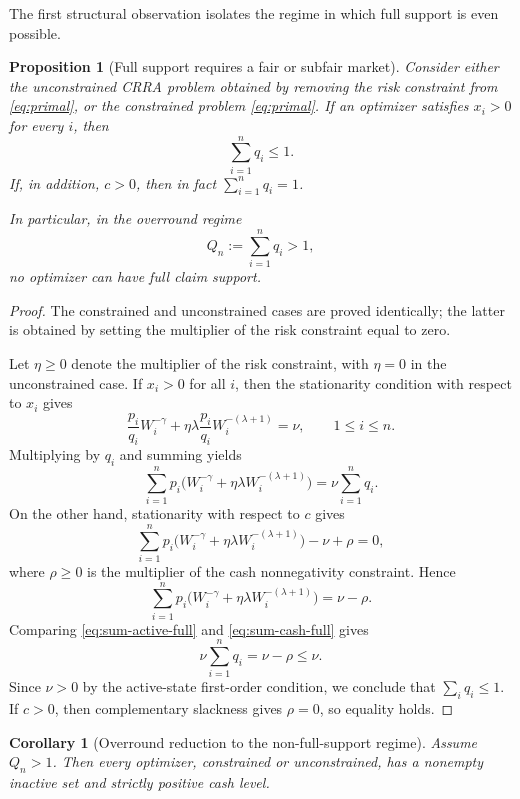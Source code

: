 \documentclass[11pt]{article}
\newtheorem{proposition}[theorem]{Proposition}
\newtheorem{corollary}[theorem]{Corollary}
\theoremstyle{definition}
\theoremstyle{remark}
\newcommand{\1}{\mathbf{1}}
\begin{document}
The first structural observation isolates the regime in which full support is even possible.

\begin{proposition}[Full support requires a fair or subfair market]
\label{prop:full-support-obstruction}
Consider either the unconstrained CRRA problem obtained by removing the risk constraint from \eqref{eq:primal}, or the constrained problem \eqref{eq:primal}. If an optimizer satisfies $x_i>0$ for every $i$, then
\[
\sum_{i=1}^n q_i\le 1.
\]
If, in addition, $c>0$, then in fact $\sum_{i=1}^n q_i=1$.

In particular, in the overround regime
\[
Q_n:=\sum_{i=1}^n q_i>1,
\]
no optimizer can have full claim support.
\end{proposition}

\begin{proof}
The constrained and unconstrained cases are proved identically; the latter is obtained by setting the multiplier of the risk constraint equal to zero.

Let $\eta\ge 0$ denote the multiplier of the risk constraint, with $\eta=0$ in the unconstrained case. If $x_i>0$ for all $i$, then the stationarity condition with respect to $x_i$ gives
\[
\frac{p_i}{q_i}W_i^{-\gamma}+\eta\lambda \frac{p_i}{q_i}W_i^{-(\lambda+1)}=\nu,
\qquad 1\le i\le n.
\]
Multiplying by $q_i$ and summing yields
\begin{equation}
\label{eq:sum-active-full}
\sum_{i=1}^n p_i\bigl(W_i^{-\gamma}+\eta\lambda W_i^{-(\lambda+1)}\bigr)=\nu\sum_{i=1}^n q_i.
\end{equation}
On the other hand, stationarity with respect to $c$ gives
\[
\sum_{i=1}^n p_i\bigl(W_i^{-\gamma}+\eta\lambda W_i^{-(\lambda+1)}\bigr)-\nu+\rho=0,
\]
where $\rho\ge 0$ is the multiplier of the cash nonnegativity constraint. Hence
\begin{equation}
\label{eq:sum-cash-full}
\sum_{i=1}^n p_i\bigl(W_i^{-\gamma}+\eta\lambda W_i^{-(\lambda+1)}\bigr)=\nu-\rho.
\end{equation}
Comparing \eqref{eq:sum-active-full} and \eqref{eq:sum-cash-full} gives
\[
\nu\sum_{i=1}^n q_i=\nu-\rho\le \nu.
\]
Since $\nu>0$ by the active-state first-order condition, we conclude that $\sum_i q_i\le 1$. If $c>0$, then complementary slackness gives $\rho=0$, so equality holds.
\end{proof}

\begin{corollary}[Overround reduction to the non-full-support regime]
\label{cor:overround}
Assume $Q_n>1$. Then every optimizer, constrained or unconstrained, has a nonempty inactive set and strictly positive cash level.
\end{corollary}
\end{document}
